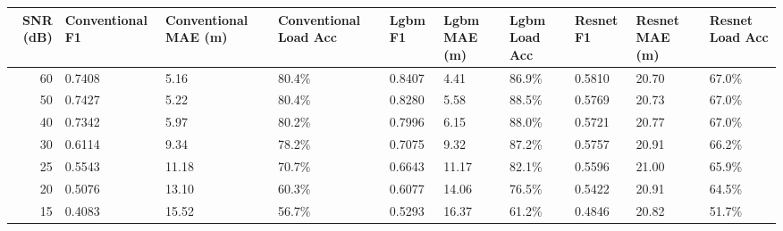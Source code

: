 \begin{tabular}{rlllllllll}
\toprule
SNR (dB) & Conventional F1 & Conventional MAE (m) & Conventional Load Acc & Lgbm F1 & Lgbm MAE (m) & Lgbm Load Acc & Resnet F1 & Resnet MAE (m) & Resnet Load Acc \\
\midrule
60 & 0.7408 & 5.16 & 80.4\% & 0.8407 & 4.41 & 86.9\% & 0.5810 & 20.70 & 67.0\% \\
50 & 0.7427 & 5.22 & 80.4\% & 0.8280 & 5.58 & 88.5\% & 0.5769 & 20.73 & 67.0\% \\
40 & 0.7342 & 5.97 & 80.2\% & 0.7996 & 6.15 & 88.0\% & 0.5721 & 20.77 & 67.0\% \\
30 & 0.6114 & 9.34 & 78.2\% & 0.7075 & 9.32 & 87.2\% & 0.5757 & 20.91 & 66.2\% \\
25 & 0.5543 & 11.18 & 70.7\% & 0.6643 & 11.17 & 82.1\% & 0.5596 & 21.00 & 65.9\% \\
20 & 0.5076 & 13.10 & 60.3\% & 0.6077 & 14.06 & 76.5\% & 0.5422 & 20.91 & 64.5\% \\
15 & 0.4083 & 15.52 & 56.7\% & 0.5293 & 16.37 & 61.2\% & 0.4846 & 20.82 & 51.7\% \\
\bottomrule
\end{tabular}
